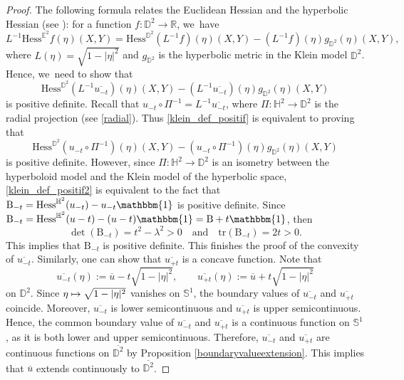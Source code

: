 \documentclass[10pt]{amsart}
\newcommand\mto{\mathchoice{\longmapsto}{\mapsto}{\mapsto}{\mapsto}}
\theoremstyle{plain}
\theoremstyle{definition}
\newcommand{\hess}{\mathrm{Hess}^{\mathbb{H}^2}}
\newcommand{\B}{\mathrm{B}}
\begin{document}
\begin{proof}
The following formula relates the Euclidean Hessian and the hyperbolic Hessian (see \cite[Cor.\,2.7]{barbotfillastre}): for a function \(f: \mathbb{D}^2 \to \mathbb{R} \), we~have
\[
L^{-1} \mathrm{Hess}^{\mathbb{E}^2} f(\eta)(X,Y) = \mathrm{Hess}^{\mathbb{D}^2}(L^{-1} f)(\eta)(X,Y) - (L^{-1} f)(\eta) g_{\mathbb{D}^2}(\eta)(X,Y),
\]
where \(L(\eta) = \sqrt{1 - \lvert \eta \rvert^2} \) and \(g_{\mathbb{D}^2} \) is the hyperbolic metric in the Klein model \(\mathbb{D}^2\). Hence, we~need to show that
\begin{equation}\label{klein_def_positif}
\mathrm{Hess}^{\mathbb{D}^2}(L^{-1} \overline{u_{{-t}}})(\eta)(X,Y) - (L^{-1} \overline{u_{{-t}}})(\eta) g_{\mathbb{D}^2}(\eta)(X,Y)
\end{equation}
is positive definite. Recall that \(u_{-t} \circ \Pi^{-1} = L^{-1} \overline{u_{-t}} \), where \(\Pi: \mathbb{H}^2 \to \mathbb{D}^2 \) is the radial projection (see \eqref{radial}). Thus \eqref{klein_def_positif} is equivalent to proving that
\begin{equation}\label{klein_def_positif2}
\mathrm{Hess}^{\mathbb{D}^2}(u_{-t} \circ \Pi^{-1})(\eta)(X,Y) - (u_{-t} \circ \Pi^{-1})(\eta) g_{\mathbb{D}^2}(\eta)(X,Y)
\end{equation}
is positive definite. However, since \(\Pi: \mathbb{H}^2 \to \mathbb{D}^2\) is an isometry between the hyperboloid model and the Klein model of the hyperbolic space, \eqref{klein_def_positif2} is equivalent to the fact that \(\B_{{-t}} = \hess(u_{-t}) - u_{-t} \mathbbm{1} \) is positive definite. Since \(\B_{{-t}} = \hess(u - t) - (u - t) \mathbbm{1} = \B + t \mathbbm{1} \), then
\[
\det(\B_{{-t}}) = t^2 - \lambda^2 > 0 \quad \text{and} \quad \mathrm{tr}(\B_{{-t}}) = 2t > 0.
\]
This implies that \(\B_{{-t}} \) is positive definite. This finishes the proof of the convexity of \(\overline{u_{{-t}}} \). Similarly, one can show that \(\overline{u_{{+t}}} \) is a concave function.
Note that
\[
\overline{u_{-t}}(\eta) := \overline{u} - t\sqrt{1-\lvert\eta\rvert^2}, \qquad \overline{u_{+t}}(\eta) := \overline{u} +t\sqrt{1-\lvert\eta\rvert^2}
\]
on $\mathbb{D}^2$. Since $\eta\mto\sqrt{1-\lvert\eta\rvert^2}$ vanishes on $\mathbb{S}^1$, the boundary values of $\overline{u_{-t}}$ and $\overline{u_{+t}}$ coincide. Moreover, $\overline{u_{-t}}$ is lower semicontinuous and $\overline{u_{+t}}$ is upper semicontinuous. Hence, the common boundary value of $\overline{u_{-t}}$ and $\overline{u_{+t}}$ is a continuous function on $\mathbb{S}^1$, as it is both lower and upper semicontinuous. Therefore, $\overline{u_{-t}}$ and $\overline{u_{+t}}$ are continuous functions on $\overline{\mathbb{D}^2}$ by Proposition \ref{boundaryvalueextension}. This implies that $\overline{u}$ extends continuously to $\overline{\mathbb{D}^2}$.\end{proof}
\end{document}
